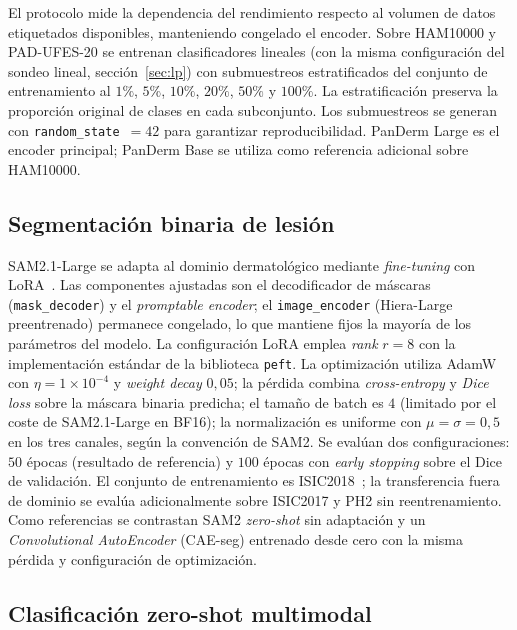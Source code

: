 El protocolo mide la dependencia del rendimiento respecto al
volumen de datos etiquetados disponibles, manteniendo congelado el
encoder. Sobre HAM10000 y PAD-UFES-20 se entrenan clasificadores
lineales (con la misma configuración del sondeo lineal,
secci\'on~\ref{sec:lp}) con submuestreos estratificados del conjunto de
entrenamiento al $1\%$, $5\%$, $10\%$, $20\%$,
$50\%$ y $100\%$. La estratificación preserva la
proporción original de clases en cada subconjunto. Los submuestreos
se generan con \texttt{random\_state}~$=42$ para garantizar
reproducibilidad. PanDerm Large es el encoder principal; PanDerm
Base se utiliza como referencia adicional sobre HAM10000.

\subsection{Segmentación binaria de lesión}
\label{sec:segmentacion}

SAM2.1-Large se adapta al dominio dermatológico mediante
\emph{fine-tuning} con LoRA~\cite{lora}. Las componentes ajustadas
son el decodificador de máscaras (\texttt{mask\_decoder}) y el
\emph{promptable encoder}; el \texttt{image\_encoder} (Hiera-Large
preentrenado) permanece congelado, lo que mantiene fijos la
mayoría de los parámetros del modelo. La configuración LoRA emplea
\emph{rank} $r = 8$ con la implementación estándar de la biblioteca
\texttt{peft}. La optimización utiliza AdamW con
$\eta = 1\times 10^{-4}$ y \emph{weight decay} $0{,}05$; la
pérdida combina \emph{cross-entropy} y \emph{Dice loss} sobre la
máscara binaria predicha; el tamaño de batch es $4$ (limitado
por el coste de SAM2.1-Large en BF16); la normalización es uniforme
con $\mu = \sigma = 0{,}5$ en los tres canales, según la
convención de SAM2. Se evalúan dos configuraciones: $50$ épocas
(resultado de referencia) y $100$ épocas con \emph{early
stopping} sobre el Dice de validación. El conjunto de entrenamiento
es ISIC2018~\cite{isic2018}; la transferencia fuera de dominio se
evalúa adicionalmente sobre ISIC2017 y PH2 sin reentrenamiento.
Como referencias se contrastan SAM2 \emph{zero-shot} sin adaptación
y un \emph{Convolutional AutoEncoder} (CAE-seg) entrenado desde
cero con la misma pérdida y configuración de optimización.

\subsection{Clasificación zero-shot multimodal}
\label{sec:zs}

